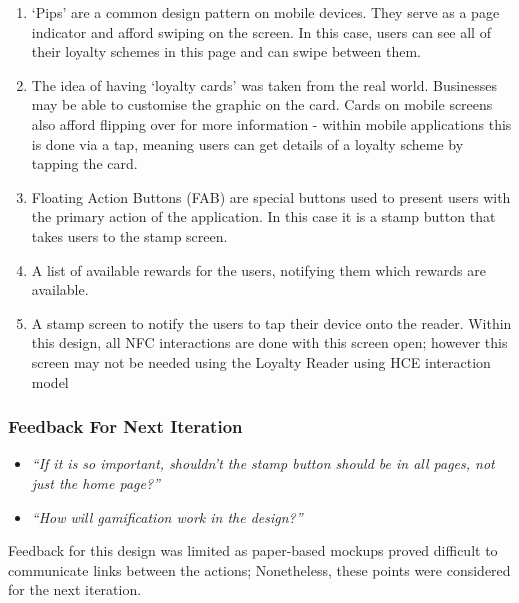 \begin{enumerate}
  \item `Pips' are a common design pattern on mobile devices. They serve as a page indicator and afford swiping on the screen. In this case, users can see all of their loyalty schemes in this page and can swipe between them. 
  \item The idea of having `loyalty cards' was taken from the real world. Businesses may be able to customise the graphic on the card.  Cards on mobile screens also afford flipping over for more information - within mobile applications this is done via a tap, meaning users can get details of a loyalty scheme by tapping the card.  
  \item Floating Action Buttons (FAB) are special buttons used to present users with the primary action of the application. In this case it is a stamp button that takes users to the stamp screen.
  \item A list of available rewards for the users, notifying them which rewards are available.
  \item A stamp screen to notify the users to tap their device onto the reader. Within this design, all NFC interactions are done with this screen open; however this screen may not be needed using the Loyalty Reader using HCE interaction model
\end{enumerate}

\subsubsection{Feedback For Next Iteration}
\begin{itemize}
  \item \textit{``If it is so important, shouldn't the stamp button should be in all pages, not just the home page?''}
  \item \textit{``How will gamification work in the design?''}
\end{itemize}

Feedback for this design was limited as paper-based mockups proved difficult to communicate links between the actions; Nonetheless, these points were considered for the next iteration.


